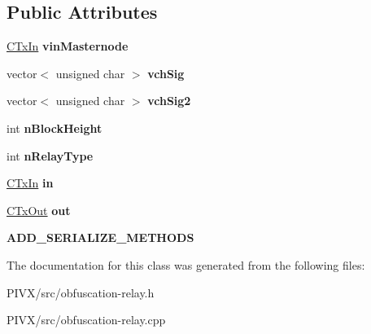 \subsection*{Public Attributes}
\begin{DoxyCompactItemize}
\item 
\mbox{\label{class_c_obfu_scation_relay_a2ed0c6540e4ca29ca8a3da93a7afcd6c}} 
\mbox{\hyperlink{class_c_tx_in}{C\+Tx\+In}} {\bfseries vin\+Masternode}
\item 
\mbox{\label{class_c_obfu_scation_relay_a447bd41831d194cb75bc510c6e017d09}} 
vector$<$ unsigned char $>$ {\bfseries vch\+Sig}
\item 
\mbox{\label{class_c_obfu_scation_relay_a9219391dcbec4c9ee0908cda8231db87}} 
vector$<$ unsigned char $>$ {\bfseries vch\+Sig2}
\item 
\mbox{\label{class_c_obfu_scation_relay_a2fff72497df00c2cdfb831d509e6eee8}} 
int {\bfseries n\+Block\+Height}
\item 
\mbox{\label{class_c_obfu_scation_relay_a5649103671b2584c53b66ae889103c0a}} 
int {\bfseries n\+Relay\+Type}
\item 
\mbox{\label{class_c_obfu_scation_relay_a360c5bb13099d76d38218ae146e6bcff}} 
\mbox{\hyperlink{class_c_tx_in}{C\+Tx\+In}} {\bfseries in}
\item 
\mbox{\label{class_c_obfu_scation_relay_a9dce88a9df20b198f0feb9c95953dcc9}} 
\mbox{\hyperlink{class_c_tx_out}{C\+Tx\+Out}} {\bfseries out}
\item 
\mbox{\label{class_c_obfu_scation_relay_ae493c4af77e1350956ffabce327c54ad}} 
{\bfseries A\+D\+D\+\_\+\+S\+E\+R\+I\+A\+L\+I\+Z\+E\+\_\+\+M\+E\+T\+H\+O\+DS}
\end{DoxyCompactItemize}


The documentation for this class was generated from the following files\+:\begin{DoxyCompactItemize}
\item 
P\+I\+V\+X/src/obfuscation-\/relay.\+h\item 
P\+I\+V\+X/src/obfuscation-\/relay.\+cpp\end{DoxyCompactItemize}
